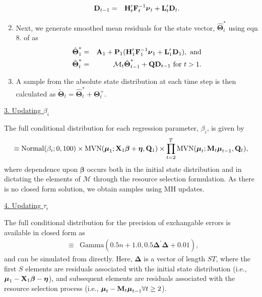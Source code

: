 \documentclass[12pt,fleqn]{article}
\begin{document}
\begin{flushleft}
\begin{enumerate}
\begin{eqnarray*}
        {\bf D}_{t-1} & = & {\bf H}_t^\prime {\bf F}_t^{-1} \boldsymbol{\nu}_t + {\bf L}_t^\prime {\bf D}_t.
      \end{eqnarray*}
  \item Next, we generate smoothed mean residuals for the state vector, $\hat{\boldsymbol{\Theta}}_t^*$ using eqn 8. of \citet{DurbinKoopman2002} as
      \begin{eqnarray*}
        \hat{\boldsymbol{\Theta}}_1^* & = &  {\bf A}_1 + {\bf P}_1 ( {\bf H}_1^\prime {\bf F}_1^{-1} \boldsymbol{\nu}_1+{\bf L}_1^\prime {\bf D}_1), \text{ and} \\
        \hat{\boldsymbol{\Theta}}_{t}^* & = & \mathcal{M}_{t} \hat{\boldsymbol{\Theta}}_{t-1}^* + {\bf Q} {\bf D}_{t-1}  \text{ for } t>1.
      \end{eqnarray*}
  \item A sample from the absolute state distribution at each time step is then calculated as $\tilde{\boldsymbol{\Theta}}_t = \hat{\boldsymbol{\Theta}}_{t}^* + \boldsymbol{\Theta}_t^+$.
\end{enumerate}


\underline{3. Updating $\beta_i$}

\hspace{.5in}The full conditional distribution for each regression parameter, $\beta_i$, is given by
\begin{eqnarray*}
  [\beta_i | \cdot] \equiv \textrm{Normal}(\beta_i;0,100) \times \textrm{MVN}(\boldsymbol{\mu}_1; {\bf X}_1 \boldsymbol{\beta} + \boldsymbol{\eta},{\bf Q}_1) \times \prod_{t=2}^T \textrm{MVN}(\boldsymbol{\mu}_t; {\bf M}_t \boldsymbol{\mu}_{t-1},{\bf Q}_t),
\end{eqnarray*}
where dependence upon $\boldsymbol{\beta}$ occurs both in the initial state distribution and in dictating the elements of $\mathcal{M}$ through the resource selection formulation.  As there is no closed form solution, we
obtain samples using MH updates.

\underline{4. Updating $\tau_\epsilon$}

The full conditional distribution for the precision of exchangable errors is available in closed form as
\begin{eqnarray*}
  [\tau_\epsilon | \cdot] & \equiv & \textrm{Gamma}(0.5n + 1.0,0.5 \boldsymbol{\Delta}^\prime \boldsymbol{\Delta} + 0.01),
\end{eqnarray*}
and can be simulated from directly.
 Here, $\boldsymbol{\Delta}$ is a vector of length $ST$, where the first $S$ elements are residuals associated with the initial state distribution (i.e., $\boldsymbol{\mu}_1 - {\bf X}_1 \boldsymbol{\beta} -  \boldsymbol{\eta}$), and subsequent elements are residuals associated with the resource selection process (i.e., $\boldsymbol{\mu}_t - {\bf M}_t \boldsymbol{\mu}_{t-1} \forall t \ge 2$).


\end{flushleft}
\end{document}
